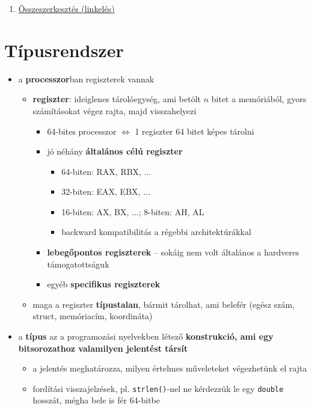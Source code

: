 \documentclass[a4paper, 11pt, oneside]{book}
\begin{document}
\begin{enumerate}[label=\Roman{*}.)]
\begin{itemize}
	\end{itemize}
	
	\item \underline{Összeszerkesztés (linkelés)}
\end{enumerate}


\section{Típusrendszer}

\begin{itemize}
	\item a \textbf{processzor}ban regiszterek vannak
	\begin{itemize}
		\item \textbf{regiszter}: ideiglenes tárolóegység, ami betölt $n$ bitet a memóriából, gyors számításokat végez rajta, majd visszahelyezi
		\begin{itemize}
			\item 64-bites processzor $\Longleftrightarrow$ 1 regiszter 64 bitet képes tárolni
			\item jó néhány \textbf{általános célú regiszter}
			\begin{itemize}
				\item 64-biten: RAX, RBX, $\ldots$
				\item 32-biten: EAX, EBX, $\ldots$
				\item 16-biten: AX, BX, $\ldots$; 8-biten: AH, AL
				\item backward kompatibilitás a régebbi architektúrákkal
			\end{itemize}
			\item \textbf{lebegőpontos regiszterek} -- sokáig nem volt általános a hardveres támogatottságuk
			\item egyéb \textbf{specifikus regiszterek}
		\end{itemize}
		\item maga a regiszter \textbf{típustalan}, bármit tárolhat, ami belefér (egész szám, struct, memóriacím, koordináta)
	\end{itemize}
	\item a \textbf{típus} az a programozási nyelvekben létező \textbf{konstrukció, ami egy bitsorozathoz valamilyen jelentést társít}
	\begin{itemize}
		\item a jelentés meghatározza, milyen értelmes műveleteket végezhetünk el rajta
		\item fordítási visszajelzések, pl. \verb*|strlen()|-nel ne kérdezzük le egy \verb*|double| hosszát, mégha bele is fér 64-bitbe

\end{itemize}
\end{itemize}
\end{document}
